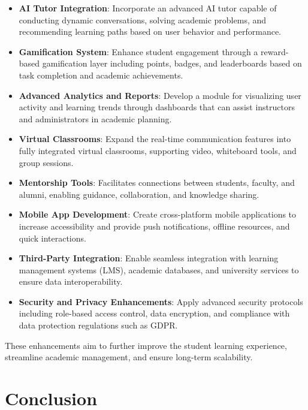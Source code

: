 \begin{itemize}
  \item \textbf{AI Tutor Integration}: Incorporate an advanced AI tutor capable of conducting dynamic conversations, solving academic problems, and recommending learning paths based on user behavior and performance.

  \item \textbf{Gamification System}: Enhance student engagement through a reward-based gamification layer including points, badges, and leaderboards based on task completion and academic achievements.

  \item \textbf{Advanced Analytics and Reports}: Develop a module for visualizing user activity and learning trends through dashboards that can assist instructors and administrators in academic planning.

  \item \textbf{Virtual Classrooms}: Expand the real-time communication features into fully integrated virtual classrooms, supporting video, whiteboard tools, and group sessions.

  \item \textbf{Mentorship Tools}: Facilitates connections between students, faculty, and alumni, enabling guidance, collaboration, and knowledge sharing.

  \item \textbf{Mobile App Development}: Create cross-platform mobile applications to increase accessibility and provide push notifications, offline resources, and quick interactions.

  \item \textbf{Third-Party Integration}: Enable seamless integration with learning management systems (LMS), academic databases, and university services to ensure data interoperability.

  \item \textbf{Security and Privacy Enhancements}: Apply advanced security protocols including role-based access control, data encryption, and compliance with data protection regulations such as GDPR.
  
\end{itemize}

These enhancements aim to further improve the student learning experience, streamline academic management, and ensure long-term scalability.

\section{Conclusion}

